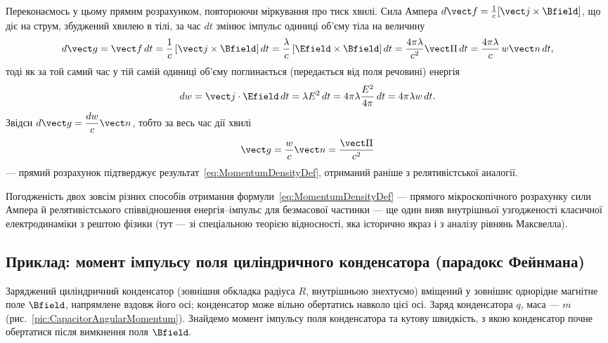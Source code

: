 Переконаємось у цьому прямим розрахунком, повторюючи міркування про тиск хвилі. Сила Ампера $d\vect f = \tfrac1c[\vect j\times\Bfield]$, що діє
на струм, збуджений хвилею в тілі, за час $dt$ змінює імпульс одиниці об'єму тіла на величину
\begin{equation*}
	d\vect g = \vect f\, dt = \frac1c\left[\vect j\times\Bfield\right]dt = \frac\lambda c\left[\Efield\times\Bfield\right]dt =
	\frac{4\pi\lambda}{c^2}\vect\Pi\, dt = \frac{4\pi\lambda}c\, w\vect n\, dt,
\end{equation*}
тоді як за той самий час у тій самій одиниці об'єму поглинається (передається від поля речовині) енергія
\begin{equation*}
	dw = \vect j\cdot\Efield\, dt = \lambda E^2\, dt = 4\pi\lambda\frac{E^2}{4\pi}\, dt = 4\pi\lambda w\, dt.
\end{equation*}
Звідси $d\vect g = \dfrac{dw}{c}\vect n$, тобто за весь час дії хвилі
\begin{equation}\label{eq:MomentumDerivation}
	\vect g = \frac{w}c\vect n = \frac{\vect\Pi}{c^2}
\end{equation}
--- прямий розрахунок підтверджує результат~\eqref{eq:MomentumDensityDef}, отриманий раніше з релятивістської аналогії.

\begin{Attention}
	Погодженість двох зовсім різних способів отримання формули~\eqref{eq:MomentumDensityDef} --- прямого мікроскопічного розрахунку сили Ампера
	й релятивістського співвідношення енергія--імпульс для безмасової частинки --- ще один вияв внутрішньої узгодженості класичної
	електродинаміки з рештою фізики (тут --- зі спеціальною теорією відносності, яка історично якраз і  з аналізу рівнянь
	Максвелла).
\end{Attention}

\subsection*{Приклад: момент імпульсу поля циліндричного конденсатора (парадокс Фейнмана)}

Заряджений циліндричний конденсатор (зовнішня обкладка радіуса $R$, внутрішньою знехтуємо) вміщений у зовнішнє однорідне магнітне поле
$\Bfield$, напрямлене вздовж його осі; конденсатор може вільно обертатись навколо цієї осі. Заряд конденсатора $q$, маса --- $m$
(рис.~\ref{pic:CapacitorAngularMomentum}). Знайдемо момент імпульсу поля конденсатора та кутову швидкість, з якою конденсатор почне обертатися
після вимкнення поля $\Bfield$.

